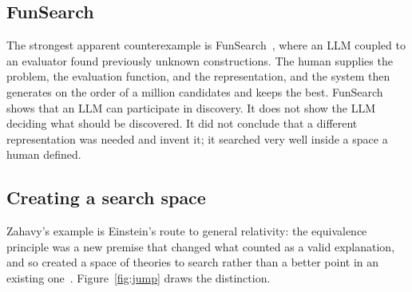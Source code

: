 \documentclass[11pt]{article}
\begin{document}
\subsection{FunSearch}

The strongest apparent counterexample is FunSearch~\cite{funsearch}, where an LLM coupled to an
evaluator found previously unknown constructions. The human supplies the problem, the evaluation
function, and the representation, and the system then generates on the order of a million candidates
and keeps the best. FunSearch shows that an LLM can participate in discovery. It does not show the
LLM deciding what should be discovered. It did not conclude that a different representation was needed
and invent it; it searched very well inside a space a human defined.

\subsection{Creating a search space}

Zahavy's example is Einstein's route to general relativity: the equivalence principle was a new premise
that changed what counted as a valid explanation, and so created a space of theories to search rather
than a better point in an existing one~\cite{zahavy}. Figure~\ref{fig:jump} draws the distinction.
\end{document}
